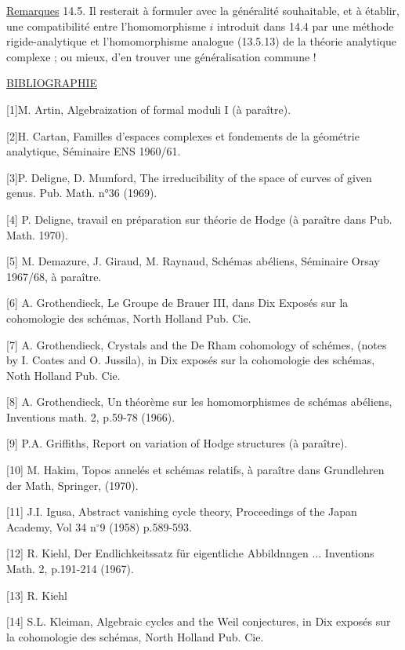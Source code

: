 \underline{Remarques} 14.5. Il resterait à formuler avec la généralité souhaitable, et à établir, une compatibilité entre l'homomorphisme $i$ introduit dans 14.4 par une méthode rigide-analytique et l'homomorphisme analogue (13.5.13) de la théorie analytique complexe ; ou mieux, d'en trouver une généralisation commune !


\underline{BIBLIOGRAPHIE}

[1]\quad M. Artin, Algebraization of formal moduli I (à paraître).

[2]\quad H. Cartan, Familles d'espaces complexes et fondements de la géométrie analytique, Séminaire ENS 1960/61.

[3]\quad P. Deligne, D. Mumford, The irreducibility of the space of curves of given genus. Pub. Math. n°36 (1969).



{[}4] P. Deligne, travail en préparation sur théorie de Hodge (à paraître dans Pub. Math. 1970).

{[}5] M. Demazure, J. Giraud, M. Raynaud, Schémas abéliens, Séminaire Orsay 1967/68, à paraître.

{[}6] A. Grothendieck, Le Groupe de Brauer III, dans Dix Exposés sur la cohomologie des schémas, North Holland Pub. Cie.

{[}7] A. Grothendieck, Crystals and the De Rham cohomology of schémes, (notes by I. Coates and O. Jussila), in Dix exposés sur la cohomologie des schémas, Noth Holland Pub. Cie.

{[}8] A. Grothendieck, Un théorème sur les homomorphismes de schémas abéliens, Inventions math. 2, p.59-78 (1966).

{[}9] P.A. Griffiths, Report on variation of Hodge structures (à paraître).

{[}10] M. Hakim, Topos annelés et schémas relatifs, à paraître dans Grundlehren der Math, Springer, (1970).

{[}11] J.I. Igusa, Abstract vanishing cycle theory, Proceedings of the Japan Academy, Vol 34 n$^\circ$9 (1958) p.589-593.

{[}12] R. Kiehl, Der Endlichkeitssatz für eigentliche Abbildnngen ... Inventions Math. 2, p.191-214 (1967).

{[}13] R. Kiehl



{[}14] S.L. Kleiman, Algebraic cycles and the Weil conjectures, in Dix exposés sur la cohomologie des schémas, North Holland Pub. Cie.

